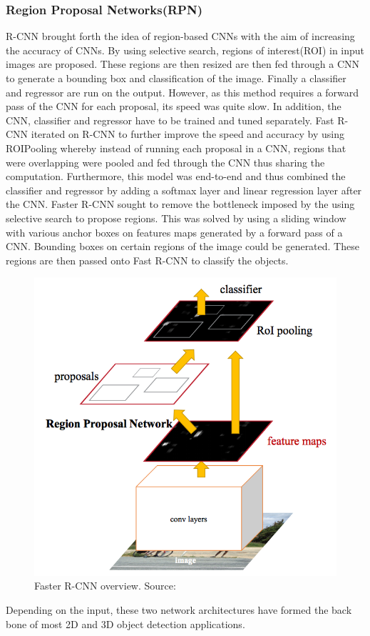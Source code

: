 \subsubsection*{Region Proposal Networks(RPN)}
R-CNN\cite{girshick2014rich} brought forth the idea of region-based CNNs with the aim of increasing the accuracy of CNNs. By using selective search, regions of interest(ROI) in input images are proposed. These regions are then resized are then fed through a CNN to generate a bounding box and classification of the image. Finally a classifier and regressor are run on the output. However, as this method requires a forward pass of the CNN for each proposal, its speed was quite slow. In addition, the CNN, classifier and regressor have to be trained and tuned separately. 
Fast R-CNN\cite{girshickICCV15fastrcnn} iterated on R-CNN to further improve the speed and accuracy by using ROIPooling whereby instead of running each proposal in a CNN, regions that were overlapping were pooled and fed through the CNN thus sharing the computation. Furthermore, this model was end-to-end and thus combined the classifier and regressor  by adding a softmax layer and linear regression layer after the CNN.
Faster R-CNN\cite{ren2015faster} sought to remove the bottleneck imposed by the using selective search to propose regions. This was solved by using a sliding window with various anchor boxes on features maps generated by a forward pass of a CNN. Bounding boxes on certain regions of the image could be generated. These regions are then passed onto Fast R-CNN to classify the objects. 
\begin{figure}[h]
	\centering
	\includegraphics[width=0.5\linewidth]{images/fastercnn}
	\caption{Faster R-CNN overview. Source:\cite{ren2015faster}}
\end{figure}


Depending on the input, these two network architectures have formed the back bone of most 2D and 3D object detection applications. 
